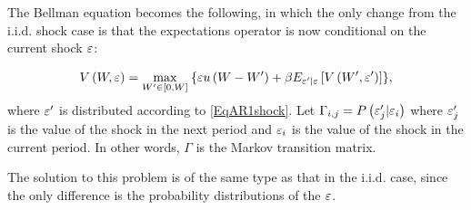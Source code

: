 The Bellman equation becomes the following, in which the only change from the i.i.d. shock case is that the
expectations operator is now conditional on the current shock $\varepsilon$:

\begin{equation*}
   V\left(W,\varepsilon\right) = \max_{W'\in[0,W]}\: \{\varepsilon u\left(W - W'\right) +
   \beta E_{\varepsilon'|\varepsilon}\left[V\left(W',\varepsilon'\right)\right]\},
\end{equation*}
where $\varepsilon'$ is distributed according to \eqref{EqAR1shock}.
Let $\Gamma_{i,j}=P\left(\varepsilon_j'|\varepsilon_i\right)$ where $\varepsilon_j'$ is the value of the shock in
the next period and $\varepsilon_i$ is the value of the shock in the current period.
In other words, $\Gamma$ is the Markov transition matrix.

The solution to this problem is of the same type as that in the i.i.d. case, since the only difference is
the probability distributions of the $\varepsilon$.

